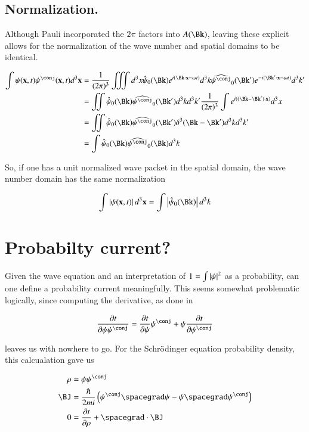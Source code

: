 \documentclass{article}
\begin{document}
\subsection{ Normalization. }

Although Pauli incorporated the $2\pi$ factors into $A(\Bk)$, leaving these explicit allows for the normalization of the wave number and spatial domains
to be identical.

\begin{align*}
\int
\psi(\Bx,t) \psi^\conj(\Bx,t) d^3 \Bx
&=
\inv{({2\pi})^3}
\iiint d^3 x
\hat{\psi}_0(\Bk) e^{ i (\Bk \cdot \Bx - \omega t)} d^3 k
\widehat{\psi^\conj}_0(\Bk') e^{ -i (\Bk' \cdot \Bx - \omega t)} d^3 k'
\\
&=
\iint \hat{\psi}_0(\Bk) \widehat{\psi^\conj}_0(\Bk')
d^3 k d^3 k'
\inv{({2\pi})^3} \int e^{ i ((\Bk- \Bk') \cdot \Bx)} d^3 x
\\
&=
\iint \hat{\psi}_0(\Bk) \widehat{\psi^\conj}_0(\Bk') \delta^3(\Bk-\Bk') d^3 k d^3 k'
\\
&=
\int \hat{\psi}_0(\Bk) \widehat{\psi^\conj}_0(\Bk) d^3 k
\\
\end{align*}

So, if one has a unit normalized wave packet in the spatial domain, the wave number domain has the same normalization

\begin{align}
\int \Abs{\psi(\Bx,t)} d^3 \Bx = \int \Abs{\hat{\psi}_0(\Bk)} d^3 k
\end{align}

\section{ Probabilty current? }

Given the wave equation and an interpretation of $1 = \int \left\lvert{\psi}\right\rvert^2$ as a probability, can one define a probability current meaningfully.  This
seems somewhat problematic logically, since computing the derivative, as done in \cite{PJprobCurrent}

\begin{align*}
\PD{t}{\psi\psi^\conj} = \PD{t}{\psi}\psi^\conj + \psi \PD{t}{\psi^\conj}
\end{align*}

leaves us with nowhere to go.  For the
Schr\"{o}dinger equation probability density, this calcualation gave us

\begin{align}\label{eqn:pcons}
\rho &= \psi\psi^\conj \\
\BJ &= \frac{\hbar}{2mi} \left( \psi^\conj \spacegrad \psi - \psi \spacegrad \psi^\conj \right) \\
0 &= \PD{t}{\rho} + \spacegrad \cdot \BJ
\end{align}
\end{document}
